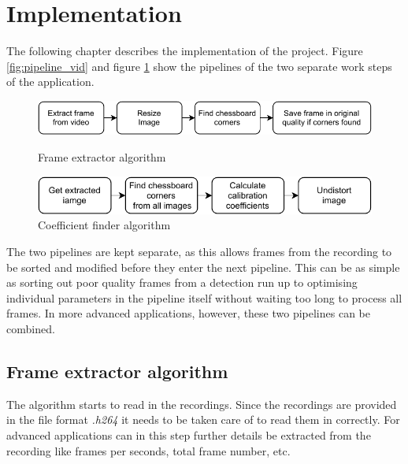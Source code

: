 \section{Implementation}\label{implement}

The following chapter describes the implementation of the project. Figure \ref{fig:pipeline_vid} and figure \ref{fig:pipeline_pic} show the pipelines of the two separate work steps of the application.
\vspace{2mm}

\begin{figure}[H]
    \centering
    \begin{minipage}[b]{0.8\textwidth}
         \centering
         \includegraphics[width=\textwidth]{image/2/pipeline_2_1.pdf}
         \caption{Frame extractor algorithm}
         \label{fig:pipeline_vid}\par
         \vspace{6mm}
         \includegraphics[width=\textwidth]{image/2/pipeline_2_2.pdf}
         \caption{Coefficient finder algorithm}
         \label{fig:pipeline_pic}
     \end{minipage}
\end{figure}

The two pipelines are kept separate, as this allows frames from the recording to be sorted and modified before they enter the next pipeline. This can be as simple as sorting out poor quality frames from a detection run up to optimising individual parameters in the pipeline itself without waiting too long to process all frames. In more advanced applications, however, these two pipelines can be combined.\\

\subsection{Frame extractor algorithm}\label{video_alg}

The algorithm starts to read in the recordings. Since the recordings are provided in the file format \textit{.h264} it needs to be taken care of to read them in correctly. For advanced applications can in this step further details be extracted from the recording like frames per seconds, total frame number, etc.\\

